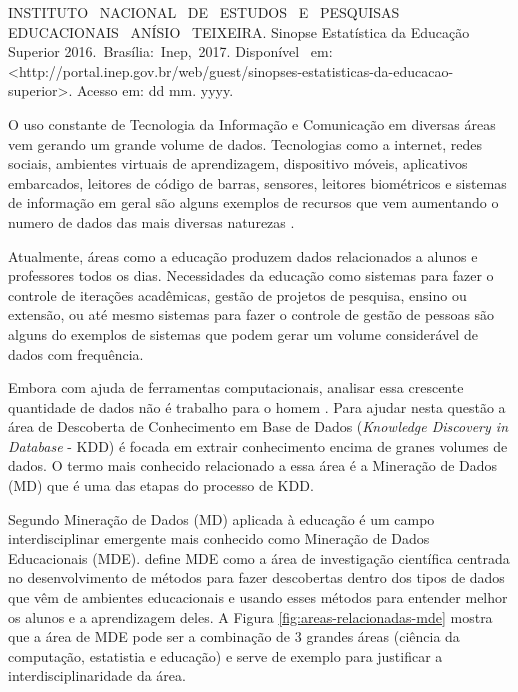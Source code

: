 \documentclass[diss-proposta,nocipinfo]{texufpel}
\begin{document}
INSTITUTO  NACIONAL  DE  ESTUDOS  E  PESQUISAS  EDUCACIONAIS  ANÍSIO  TEIXEIRA. 
Sinopse Estatística da Educação Superior 2016. Brasília: Inep, 2017. Disponível  em:  <http://portal.inep.gov.br/web/guest/sinopses-estatisticas-da-educacao-superior>. Acesso em: dd mm. yyyy.  


O uso constante de Tecnologia da Informação e Comunicação em diversas áreas vem gerando um grande volume de dados.
Tecnologias como a internet, redes sociais, ambientes virtuais de aprendizagem, dispositivo móveis, aplicativos embarcados, leitores de código de barras, sensores, leitores biométricos e sistemas de informação em geral são alguns exemplos de recursos que vem aumentando o numero de dados das mais diversas naturezas \cite{goldschmidt2015data}.

Atualmente, áreas como a educação produzem dados relacionados a alunos e professores todos os dias.
Necessidades da educação como sistemas para fazer o controle de iterações acadêmicas, gestão de projetos de pesquisa, ensino ou extensão, ou até mesmo sistemas para fazer o controle de gestão de pessoas são alguns do exemplos de sistemas que podem gerar um volume considerável de dados com frequência.

Embora com ajuda de ferramentas computacionais, analisar essa crescente quantidade de dados não é trabalho para o homem \cite{goldschmidt2015data}. Para ajudar nesta questão a área de Descoberta de Conhecimento em Base de Dados (\textit{Knowledge Discovery in Database} - KDD) é focada em extrair conhecimento encima de granes volumes de dados. O termo mais conhecido relacionado a essa área é a Mineração de Dados (MD) que é uma das etapas do processo de KDD.

Segundo \citet{Koedinger2008} Mineração de Dados (MD) aplicada à educação é um campo interdisciplinar emergente mais conhecido como Mineração de Dados Educacionais (MDE).
\citet{baker2010data} define MDE como a área de investigação científica centrada no desenvolvimento de métodos para fazer descobertas dentro dos tipos de dados que vêm de ambientes educacionais e usando esses métodos para entender melhor os alunos e a aprendizagem deles. A Figura \ref{fig:areas-relacionadas-mde} mostra que a área de MDE pode ser a combinação de 3 grandes áreas (ciência da computação, estatistia e educação) e serve de exemplo para justificar a interdisciplinaridade da área.
\end{document}
